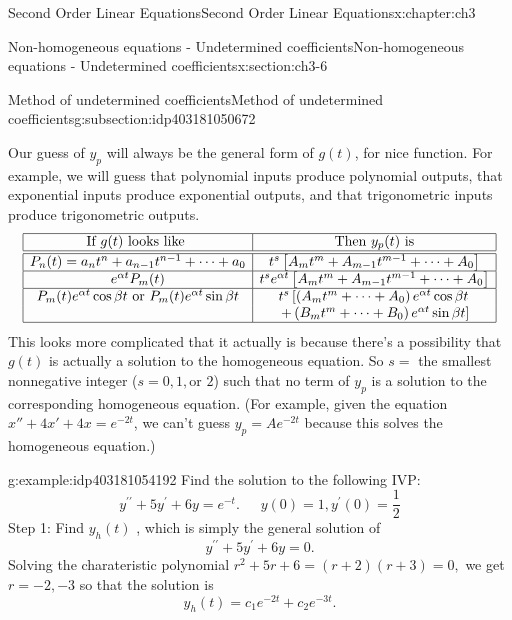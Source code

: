 \documentclass[oneside,10pt,]{book}
\numberwithin{equation}{section}
\numberwithin{equation}{section}
\newcommand{\amp}{&}
\begin{document}
\begin{chapterptx}{Second Order Linear Equations}{}{Second Order Linear Equations}{}{}{x:chapter:ch3}
\begin{sectionptx}{Non-homogeneous equations - Undetermined coefficients}{}{Non-homogeneous equations - Undetermined coefficients}{}{}{x:section:ch3-6}
\begin{subsectionptx}{Method of undetermined coefficients}{}{Method of undetermined coefficients}{}{}{g:subsection:idp403181050672}
\par
Our guess of \(y_{p}\) will always be the general form of \(g(t)\), for nice function. For example, we will guess that polynomial inputs produce polynomial outputs, that exponential inputs produce exponential outputs, and that trigonometric inputs produce trigonometric outputs.%
\begin{equation*}
\begin{array}{|c|c|}
\hline
\text{If } g(t) \text{ looks like }  \amp \text{Then } y_{p}(t) \text{ is}\\
\hline
\hline
P_{n}(t)=a_{n}t^{n}+a_{n-1}t^{n-1}+\cdots+a_{0} \amp t^{s}\left[A_{m}t^{m}+A_{m-1}t^{m-1}+\cdots+A_{0}\right]\\
\hline
e^{\alpha t}P_{m}(t) \amp t^{s}e^{\alpha t}\left[A_{m}t^{m}+A_{m-1}t^{m-1}+\cdots+A_{0}\right]\\
\hline
P_{m}(t)e^{\alpha t}\cos\beta t \text{ or } P_{m}(t)e^{\alpha t}\sin\beta t \amp t^{s}\left[\left(A_{m}t^{m}+\cdots+A_{0}\right)e^{\alpha t}\cos\beta t\right. \\
\amp \left.+\left(B_{m}t^{m}+\cdots+B_{0}\right)e^{\alpha t}\sin\beta t\right]\\
\hline
\end{array}
\end{equation*}
This looks more complicated that it actually is because there's a possibility that \(g(t)\) is actually a solution to the homogeneous equation. So \(s=\) the smallest nonnegative integer (\(s=0,1,\)or \(2\)) such that no term of \(y_{p}\) is a solution to the corresponding homogeneous equation. (For example, given the equation \(x'' + 4x' + 4x = e^{-2t}\), we can't guess \(y_p = A e^{-2t}\) because this solves the homogeneous equation.)%
\begin{example}{}{g:example:idp403181054192}%
Find the solution to the following IVP:%
\begin{equation*}
y^{\prime\prime}+5y^{\prime}+6y=e^{-t}.\,\,\,\,\,\,\,\,\,y(0)=1,y^{\prime}(0)=\frac{1}{2}
\end{equation*}
Step 1: Find \(y_{h}(t)\) , which is simply the general solution of%
\begin{equation*}
y^{\prime\prime}+5y^{\prime}+6y=0.
\end{equation*}
Solving the charateristic polynomial \(r^{2}+5r+6=(r+2)(r+3)= 0,\) we get \(r=-2,-3\) so that the solution is%
\begin{equation*}
y_{h}(t)=c_{1}e^{-2t}+c_{2}e^{-3t}.
\end{equation*}
%
\par

\end{example}
\end{subsectionptx}
\end{sectionptx}
\end{chapterptx}
\end{document}
